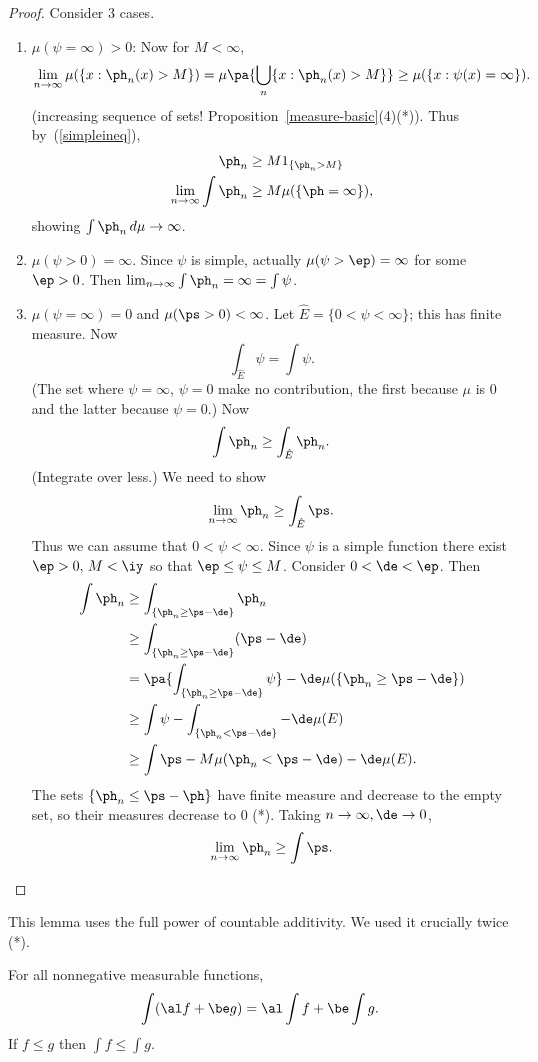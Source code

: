 \begin{proof}
Consider 3 cases.
\begin{enumerate}
\item
$\mu(\psi=\infty)>0$: %
Now for $M<\infty$, 
\[
\lim_{n\to \infty} \mu(\{x:\ph_n(x)>M\})=\mu\pa{\bigcup_n \{x:\ph_n(x)>M\}}\geq \mu(\{x:\psi(x)=\infty\}).
\]
(increasing sequence of sets! Proposition~\ref{measure-basic}(4)(*)).
Thus by~(\ref{simpleineq}),
\begin{align*}
\ph_n &\geq M1_{\{\ph_n>M\}}\\
\lim_{n\to \infty}\int \ph_n &\geq M\mu(\{\ph=\infty\}),
\end{align*}
showing $\int \ph_n\,d\mu\to \infty$.
\item $\mu(\psi>0)=\infty$. Since $\psi$ is simple, actually $\mu(\psi>\ep)=\infty$ for some $\ep>0$. Then
$\lim_{n\to \infty} \int \ph_n=\infty=\int \psi$.
\item $\mu(\psi=\infty)=0$ and $\mu(\ps>0)<\infty$. Let $\hat{E}=\{0<\psi<\infty\}$; this has finite measure. Now
\[
\int_{\hat{E}}\psi=\int \psi.
\]
(The set where $\psi=\infty$, $\psi=0$ make no contribution, the first because $\mu$ is 0 and the latter because $\psi=0$.) Now 
\[
\int \ph_n \geq \int_{\hat E} \ph_n.
\]
(Integrate over less.) We need to show
\[
\lim_{n\to \infty}\ph_n\geq \int_{\hat E} \ps.
\]
Thus we can assume that $0<\psi<\infty$. Since $\psi$ is a simple function there exist $\ep>0,\,M<\iy$ so that $\ep\leq \psi\leq M$. Consider $0<\de<\ep$. Then
\begin{align*}
\int \ph_n&\geq \int_{\{\ph_n\ge \ps-\de\}}\ph_n\\
&\geq \int_{\{\ph_n\ge \ps-\de\}} (\ps-\de)\\
&=\pa{\int_{\{\ph_n\ge \ps-\de\}}\psi}-\de\mu(\{\ph_n\ge \ps-\de\})\\
%
&\geq \int \psi-\int_{\{\ph_n< \ps-\de\}}-\de\mu(E)\\
&\ge \int \ps-M\mu(\ph_n< \ps-\de)-\de \mu(E).
\end{align*}
The sets $\{\ph_n\leq \ps-\ph\}$ have finite measure and decrease to the empty set, so their measures decrease to 0 (*). Taking $n\to \infty,\de\to 0$,
\[
\lim_{n\to \infty} \ph_n\geq \int \ps.%
\]
\end{enumerate}
\end{proof}
This lemma uses the full power of countable additivity. We used it crucially twice (*).
\begin{pr}
For all nonnegative measurable functions,
\[\int (\al f +\be g)=\al\int f+\be \int g.\]
If $f\leq g$ then $\int f\leq \int g$. 
\end{pr}
